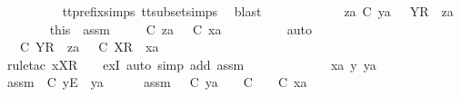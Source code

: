 \ \ \ \ \ \ \ \ \isamarkupfalse%
\ tt{\isacharunderscore}prefix{\isachardot}simps{\isacharparenleft}{}{\isacharparenright}\ tt{\isacharunderscore}subset{\isachardot}simps{\isacharparenleft}{}{\isacharparenright}\ \isamarkupfalse%
\ blast\isanewline
\ \ \ \ \isamarkupfalse%
\isanewline
\ \ \ \ \ \ \isamarkupfalse%
\ {\isachardoublequoteopen}za\ {\isasymle}\isactrlsub C\ ya{\isachardoublequoteclose}\ {\isachardoublequoteopen}{\isasymsigma}{\isacharprime}\ {\isacharequal}\ {\isacharbrackleft}Y{\isacharbrackright}\isactrlsub R\ {\isacharhash}\ za{\isachardoublequoteclose}\isanewline
\ \ \ \ \ \ \isamarkupfalse%
\ this\ \ assm{}\ \isamarkupfalse%
\ {\isasymrho}{\isacharprime}\ \ {\isachardoublequoteopen}{\isasymrho}{\isacharprime}\ {\isasymsubseteq}\isactrlsub C\ za\ {\isasymand}\ {\isasymrho}{\isacharprime}\ {\isasymle}\isactrlsub C\ xa{\isachardoublequoteclose}\isanewline
\ \ \ \ \ \ \ \ \isamarkupfalse%
\ auto\isanewline
\ \ \ \ \ \ \isamarkupfalse%
\ \isamarkupfalse%
\ {\isachardoublequoteopen}{\isasymexists}{\isasymrho}{\isacharprime}{\isachardot}\ {\isasymrho}{\isacharprime}\ {\isasymsubseteq}\isactrlsub C\ {\isacharbrackleft}Y{\isacharbrackright}\isactrlsub R\ {\isacharhash}\ za\ {\isasymand}\ {\isasymrho}{\isacharprime}\ {\isasymle}\isactrlsub C\ {\isacharbrackleft}X{\isacharbrackright}\isactrlsub R\ {\isacharhash}\ xa{\isachardoublequoteclose}\isanewline
\ \ \ \ \ \ \ \ \isamarkupfalse%
\ {\isacharparenleft}rule{\isacharunderscore}tac\ x{\isacharequal}{\isachardoublequoteopen}{\isacharbrackleft}X{\isacharbrackright}\isactrlsub R\ {\isacharhash}\ {\isasymrho}{\isacharprime}{\isachardoublequoteclose}\ \ exI{\isacharcomma}\ auto\ simp\ add{\isacharcolon}\ assm{}{\isacharparenright}\isanewline
\ \ \ \ \isamarkupfalse%
\isanewline
\ \ \isamarkupfalse%
\isanewline
\ \ \ \ \isamarkupfalse%
\ xa\ y\ ya\ {\isasymsigma}{\isacharprime}\isanewline
\ \ \ \ \isamarkupfalse%
\ assm{}{\isacharcolon}\ {\isachardoublequoteopen}{\isasymsigma}{\isacharprime}\ {\isasymle}\isactrlsub C\ {\isacharbrackleft}y{\isacharbrackright}\isactrlsub E\ {\isacharhash}\ ya{\isachardoublequoteclose}\isanewline
\ \ \ \ \isamarkupfalse%
\ assm{}{\isacharcolon}\ {\isachardoublequoteopen}{\isacharparenleft}{\isasymAnd}{\isasymsigma}{\isacharprime}{\isachardot}\ {\isasymsigma}{\isacharprime}\ {\isasymle}\isactrlsub C\ ya\ {\isasymLongrightarrow}\ {\isasymexists}{\isasymrho}{\isacharprime}{\isachardot}\ {\isasymrho}{\isacharprime}\ {\isasymsubseteq}\isactrlsub C\ {\isasymsigma}{\isacharprime}\ {\isasymand}\ {\isasymrho}{\isacharprime}\ {\isasymle}\isactrlsub C\ xa{\isacharparenright}{\isachardoublequoteclose}\isanewline
